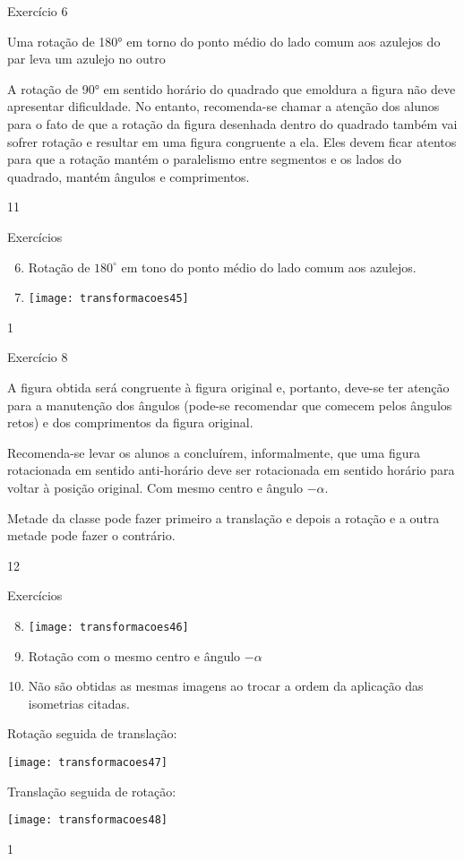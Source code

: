 \clearmargin
\begin{sugestions}{Exercício 6}
{
Uma rotação de 180° em torno do ponto médio do lado comum aos azulejos do par leva um azulejo no outro


A rotação de 90° em sentido horário do quadrado que emoldura a figura não deve apresentar dificuldade. No entanto, recomenda-se chamar a atenção dos alunos para o fato de que a rotação da figura desenhada dentro do quadrado também vai sofrer rotação e resultar em uma figura congruente a ela. Eles devem ficar atentos para que a rotação mantém o paralelismo entre segmentos e os lados do quadrado, mantém ângulos e comprimentos.    
}{1}{1}
\end{sugestions}
\begin{answer}{Exercícios}
{\exerciselist
\begin{enumerate}\setcounter{enumi}{5}
\item Rotação de $180^{\circ}$ em tono do ponto médio do lado comum aos azulejos.

\item {}
{
\texttt{[image: transformacoes45]}
}
\end{enumerate}
}{1}
\end{answer}
\clearmargin
\begin{sugestions}{Exercício 8}
{
A figura obtida será congruente à figura original e, portanto, deve-se ter atenção para a manutenção dos ângulos (pode-se recomendar que comecem pelos ângulos retos) e dos comprimentos da figura original.

Recomenda-se levar os alunos a concluírem, informalmente, que uma figura rotacionada em sentido anti-horário deve ser rotacionada em sentido horário para voltar à posição original. Com mesmo centro e ângulo $-\alpha$. 

Metade da classe pode fazer primeiro a translação e depois a rotação e a outra metade pode fazer o contrário. 
}{1}{2}
\end{sugestions}
\begin{answer}{Exercícios}
{\exerciselist
\begin{enumerate}\setcounter{enumi}{7}
\item {}
{
\texttt{[image: transformacoes46]}
}

\item Rotação com o mesmo centro e ângulo $-\alpha$


\item Não são obtidas as mesmas imagens ao trocar a ordem da aplicação das isometrias citadas. 
\end{enumerate}

\begin{multicols}{2}
\centering
Rotação seguida de translação:

\texttt{[image: transformacoes47]}

\columnbreak

Translação seguida de rotação:

\texttt{[image: transformacoes48]}
\end{multicols}
}{1}
\end{answer}
